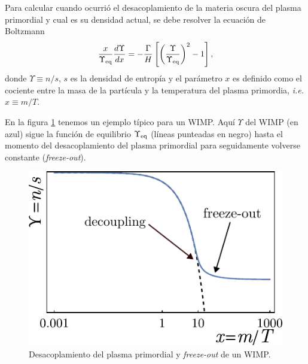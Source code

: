 Para calcular cuando ocurrió el desacoplamiento de la materia oscura del plasma primordial y cual es su densidad actual, se debe resolver la ecuación de Boltzmann
\begin{equation}
\frac{x}{\Upsilon_{\rm eq}} \frac{d\Upsilon}{dx} = - \frac{\Gamma}{H} \left[ \left( \frac{\Upsilon}{\Upsilon_{\rm eq}}\right)^2 - 1 \right],
\end{equation}
donde $\Upsilon\equiv n/s$, $s$ es la densidad de entropía y el parámetro $x$ es definido como el cociente entre la masa de la partícula y la temperatura del plasma primordia, \textit{i.e.} $x \equiv m/T$. 

En la figura \ref{wimp} tenemos un ejemplo típico para un WIMP. Aquí $\Upsilon$ del WIMP (en azul) sigue la función de equilibrio $\Upsilon_{\rm eq}$ (líneas punteadas en negro) hasta el momento del desacoplamiento del plasma primordial para seguidamente volverse constante (\textit{freeze-out}). 

\begin{figure}[h]
\centering
\includegraphics[scale=1]{Images/wimp_decoupling.pdf}
\caption{\hspace{0.1in}Desacoplamiento del plasma primordial y \textit{freeze-out} de un WIMP.}
\label{wimp}
\end{figure}



